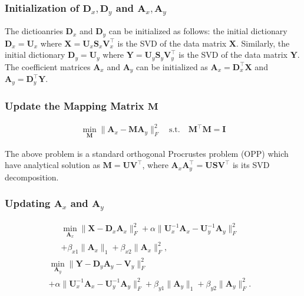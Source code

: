 \documentclass[10pt,twocolumn,letterpaper]{article}
\begin{document}
\subsubsection{Initialization of $\bm{D}_{x},\bm{D}_{y}$ and $\bm{A}_{x},\bm{A}_{y}$}

The dictioanries $\bm{D}_{x}$ and $\bm{D}_{y}$ can be initialized as follows: the initial dictionary $\bm{D}_{x}=\bm{U}_{x}$ where $\bm{X} = \bm{U}_{x}\bm{S}_{x}\bm{V}_{x}^{\top}$ is the SVD of the data matrix $\bm{X}$. Similarly, the initial dictionary $\bm{D}_{y}=\bm{U}_{y}$ where $\bm{Y} = \bm{U}_{y}\bm{S}_{y}\bm{V}_{y}^{\top}$ is the SVD of the data matrix $\bm{Y}$. The coefficient matrices $\bm{A}_{x}$ and $\bm{A}_{y}$ can be initialized as $\bm{A}_{x}=\bm{D}_{x}^{\top}\bm{X}$ and $\bm{A}_{y}=\bm{D}_{y}^{\top}\bm{Y}$.


\subsubsection{Update the Mapping Matrix $\bm{M}$}

\begin{equation}
\begin{split}
\min_{\bm{M}}
\|\bm{A}_{x}-\bm{M}\bm{A}_{y}\|_{F}^{2}
\quad
\text{s.t.}
\quad
\bm{M}^{\top}\bm{M}=\bm{I}
\end{split}
\end{equation}

The above problem is a standard orthogonal Procrustes problem (OPP) \cite{} which have analytical solution as $\bm{M}=\bm{U}\bm{V}^{\top}$, where $\bm{A}_{x}\bm{A}_{y}^{\top}=\bm{U}\bm{S}\bm{V}^{\top}$ is its SVD \cite{} decomposition.


\subsubsection{Updating $\bm{A}_{x}$ and $\bm{A}_{y}$}

\begin{equation}
\begin{split}
\min_{\bm{A}_{x}}
\|\bm{X}-\bm{D}_{x}\bm{A}_{x}\|_{F}^{2}
+
\alpha
\|\bm{U}_{x}^{-1}\bm{A}_{x}-\bm{U}_{y}^{-1}\bm{A}_{y}\|_{F}^{2}
&
\\
+
\beta_{x1}\|\bm{A}_{x}\|_{1}
+
\beta_{x2}\|\bm{A}_{x}\|_{F}^{2},
\end{split}
\end{equation}
\begin{equation}
\begin{split}
\min_{\bm{A}_{y}}
\|\bm{Y}-\bm{D}_{y}\bm{A}_{y}-\bm{V}_{y}\|_{F}^{2}
&
\\
+
\alpha
\|\bm{U}_{x}^{-1}\bm{A}_{x}-\bm{U}_{y}^{-1}\bm{A}_{y}\|_{F}^{2}
+
\beta_{y1}\|\bm{A}_{y}\|_{1}
+
\beta_{y2}\|\bm{A}_{y}\|_{F}^{2}.
\end{split}
\end{equation}
\end{document}
